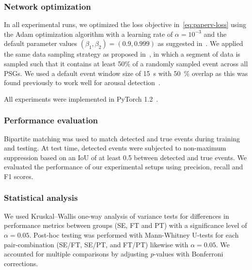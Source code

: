 \subsubsection{Network optimization}
In all experimental runs, we optimized the loss objective in~\cref{eq:paperv-loss} using the Adam optimization algorithm with a learning rate of \(\alpha=10^{-3}\) and the default parameter values \( \left( \beta_1, \beta_2 \right) = \left( 0.9, 0.999 \right) \) as suggested in~\cite{Kingma2015}.
We applied the same data sampling strategy as proposed in~\cite{Olesen2019}, in which a segment of data is sampled such that it contains at least 50\% of a randomly sampled event across all \acp{PSG}.
We used a default event window size of \SI{15}{\second} with \SI{50}{\percent} overlap as this was found previously to work well for arousal detection~\cite{Olesen2019}.

All experiments were implemented in PyTorch 1.2~\cite{Paszke2019}.

\subsubsection{Performance evaluation}
Bipartite matching was used to match detected and true events during training and testing.
At test time, detected events were subjected to non-maximum suppression based on an IoU of at least 0.5 between detected and true events.
We evaluated the performance of our experimental setups using precision, recall and F1 scores.

\subsubsection{Statistical analysis}
We used Kruskal–Wallis one-way analysis of variance tests for differences in performance metrics between groups (SE, FT and PT) with a significance level of $\alpha=0.05$.
Post-hoc testing was performed with Mann-Whitney U-tests for each pair-combination (SE/FT, SE/PT, and FT/PT) likewise with $\alpha=0.05$.
We accounted for multiple comparisons by adjusting \textit{p}-values with Bonferroni corrections.


